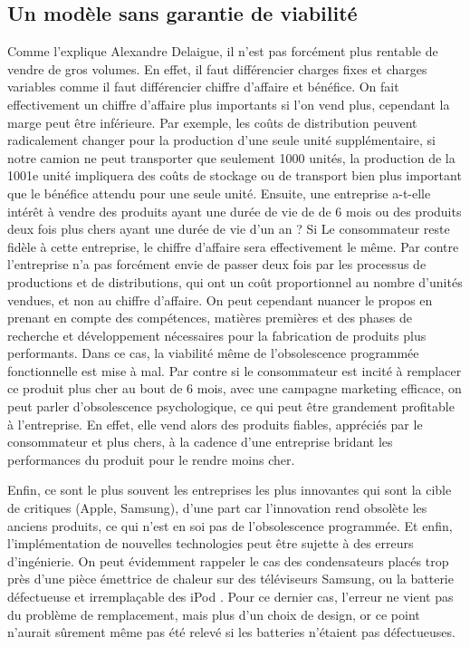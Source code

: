 \subsection{Un modèle sans garantie de viabilité}


Comme l’explique Alexandre Delaigue, il n’est pas forcément plus rentable de vendre de gros volumes.
En effet, il faut différencier charges fixes et charges variables comme il faut différencier chiffre d’affaire et bénéfice. On fait effectivement un chiffre d’affaire plus importants si l’on vend plus, cependant la marge peut être inférieure. Par exemple, les coûts de distribution peuvent radicalement changer pour la production d’une seule unité supplémentaire, si notre camion ne peut transporter que seulement  1000 unités,  la production de la 1001e unité impliquera des coûts de stockage ou de transport bien plus important que le bénéfice attendu pour une seule unité.
\medbreak
Ensuite, une entreprise a-t-elle intérêt à vendre des produits ayant une durée de vie de de 6 mois ou des produits deux fois plus chers ayant une durée de vie d’un an ? Si Le consommateur reste fidèle à cette entreprise, le chiffre d’affaire sera effectivement le même. Par contre l’entreprise n’a pas forcément envie de passer deux fois par les processus de productions et de distributions, qui ont un coût proportionnel au nombre d’unités vendues, et non au chiffre d’affaire. On peut cependant nuancer le propos en prenant en compte des compétences, matières premières  et des phases de recherche et développement nécessaires pour la fabrication de produits plus performants. Dans ce cas, la viabilité même de l’obsolescence programmée fonctionnelle est mise à mal.
\medbreak
Par contre si le consommateur est incité à remplacer ce produit plus cher au bout de 6 mois, avec une campagne marketing efficace, on peut parler d’obsolescence psychologique, ce qui peut être grandement  profitable à l’entreprise. En effet, elle vend alors des produits fiables, appréciés par le consommateur et plus chers, à la cadence d’une entreprise bridant les performances du produit pour le rendre moins cher.

\bigbreak
Enfin, ce sont le plus souvent les entreprises les plus innovantes qui sont la cible de critiques (Apple, Samsung), d’une part car l’innovation rend obsolète les anciens produits, ce qui n’est en soi pas de l’obsolescence programmée. Et enfin, l’implémentation de nouvelles technologies peut être sujette à des erreurs d’ingénierie. On peut évidemment rappeler le cas des condensateurs placés trop près d’une pièce émettrice de chaleur sur des téléviseurs Samsung, ou la batterie défectueuse et irremplaçable des iPod . Pour ce dernier cas, l’erreur ne vient pas du problème de remplacement, mais plus d'un choix de design, or ce point n’aurait sûrement même pas été relevé si les batteries n’étaient pas défectueuses.

\newpage